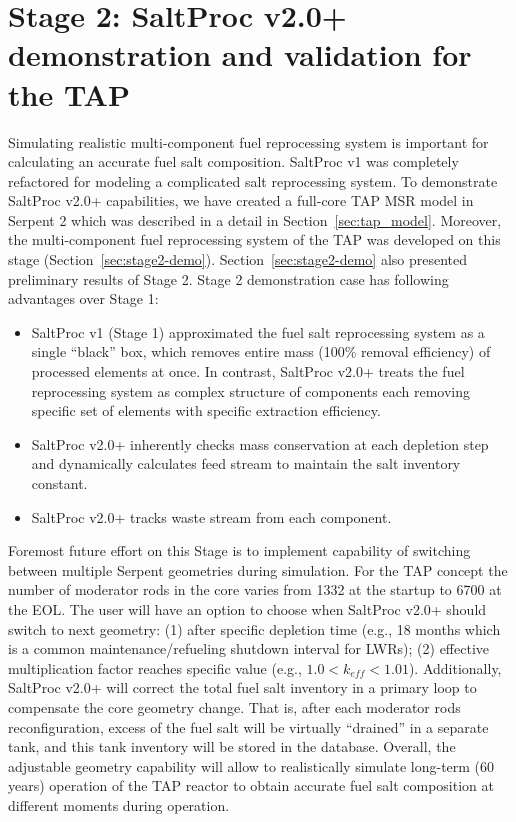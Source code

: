 \section{Stage 2: SaltProc v2.0+ demonstration and validation for the TAP}
Simulating realistic multi-component fuel reprocessing system is important for 
calculating an accurate fuel salt composition. SaltProc v1 was completely 
refactored for modeling a complicated salt reprocessing system. To demonstrate 
SaltProc v2.0+ capabilities, we have created a full-core \gls{TAP} 
\gls{MSR} model in Serpent 2 \cite{chaube_tap_2019} which was described in a 
detail in Section~\ref{sec:tap_model}. Moreover, the multi-component fuel 
reprocessing system of the \gls{TAP} was developed on this stage 
(Section~\ref{sec:stage2-demo}). Section~\ref{sec:stage2-demo} also presented 
preliminary results of Stage 2. Stage 2 demonstration case has following 
advantages over Stage 1:
\begin{itemize}
	\item SaltProc v1 (Stage 1) approximated the fuel salt reprocessing system 
	as a single ``black'' box, which removes entire mass (100\% removal 
	efficiency) of processed elements at once. In contrast, SaltProc v2.0+ 
	treats the fuel reprocessing system as complex structure of components 
	each removing specific set of elements with specific extraction 
	efficiency. 
	\item SaltProc v2.0+ inherently checks mass conservation at each depletion 
	step and dynamically calculates feed stream to maintain the salt inventory 
	constant.
	\item SaltProc v2.0+ tracks waste stream from each component.
\end{itemize}

Foremost future effort on this Stage is to implement capability of switching 
between multiple Serpent geometries during simulation. For the \gls{TAP} 
concept the number of moderator rods in the core varies from 1332 at the 
startup to 6700 at the \gls{EOL}. The user will have an option to choose when 
SaltProc v2.0+ should switch to next geometry: (1) after specific depletion  
time (e.g., 18 months which is a common maintenance/refueling 
shutdown interval for \glspl{LWR}); (2) effective multiplication factor 
reaches specific value (e.g., $1.0<k_{eff} < 1.01$). Additionally, SaltProc 
v2.0+ will correct the total fuel salt inventory in a primary loop to 
compensate the core geometry change. That is, after each moderator rods  
reconfiguration, excess of the fuel salt will be virtually ``drained'' in 
a separate tank, and this tank inventory will be stored in the database. 
Overall, the adjustable geometry capability will allow to realistically 
simulate long-term (60 years) operation of the \gls{TAP} reactor to obtain 
accurate fuel salt composition at different moments during operation.

